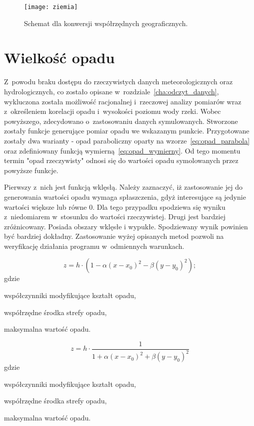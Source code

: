 \begin{figure}[!ht]
	\centering
	\texttt{[image: ziemia]}
	\caption{Schemat dla konwersji współrzędnych geograficznych.}
	\label{fig:ziemia}
\end{figure}

\section{Wielkość opadu}
\label{sec:funkcje_opadu}
Z~powodu braku dostępu do rzeczywistych danych meteorologicznych oraz hydrologicznych, co zostało opisane w~rozdziale~\ref{cha:odczyt_danych}, wykluczona została możliwość racjonalnej i~rzeczowej analizy pomiarów wraz z~określeniem korelacji opadu i~wysokości poziomu wody rzeki. Wobec powyższego, zdecydowano o~zastosowaniu danych symulowanych. Stworzone zostały funkcje generujące pomiar opadu we wskazanym punkcie. Przygotowane zostały dwa warianty - opad paraboliczny oparty na wzorze~\ref{eq:opad_parabola} oraz zdefiniowany funkcją wymierną~\ref{eq:opad_wymierny}. Od tego momentu termin "opad rzeczywisty" odnosi się do wartości opadu symolowanych przez powyższe funkcje.


Pierwszy z~nich jest funkcją wklęsłą. Należy zaznaczyć, iż zastosowanie jej do generowania wartości opadu wymaga spłaszczenia, gdyż interesujące są jedynie wartości większe lub równe 0. Dla tego przypadku spodziewa się wyniku z~niedomiarem w~stosunku do wartości rzeczywistej. Drugi jest bardziej zróżnicowany. Posiada obszary wklęsłe i wypukłe. Spodziewany wynik powinien być bardziej dokładny. Zastosowanie wyżej opisanych metod pozwoli na weryfikację działania programu w~odmiennych warunkach.

\begin{equation}
z = h \cdot (1 - \alpha (x - x_0)^2 - \beta (y - y_0)^2 );
\label{eq:opad_parabola}
\end{equation}
gdzie
\begin{description}[leftmargin=3cm, itemsep=0cm, labelsep=0cm]
	\item[$\alpha, \beta$] współczynniki modyfikujące kształt opadu,
	\item[$x_0, y_0$] współrzędne środka strefy opadu,
	\item[$h$] maksymalna wartość opadu.
\end{description}

\begin{equation}
z = h \cdot \frac{1}{1 + \alpha (x-x_0)^2 + \beta (y-y_0)^2}
\label{eq:opad_wymierny}
\end{equation}
gdzie
\begin{description}[leftmargin=3cm, itemsep=0cm, labelsep=0cm]
	\item[$\alpha, \beta$] współczynniki modyfikujące kształt opadu,
	\item[$x_0, y_0$] współrzędne środka strefy opadu,
	\item[$h$] maksymalna wartość opadu.
\end{description}

